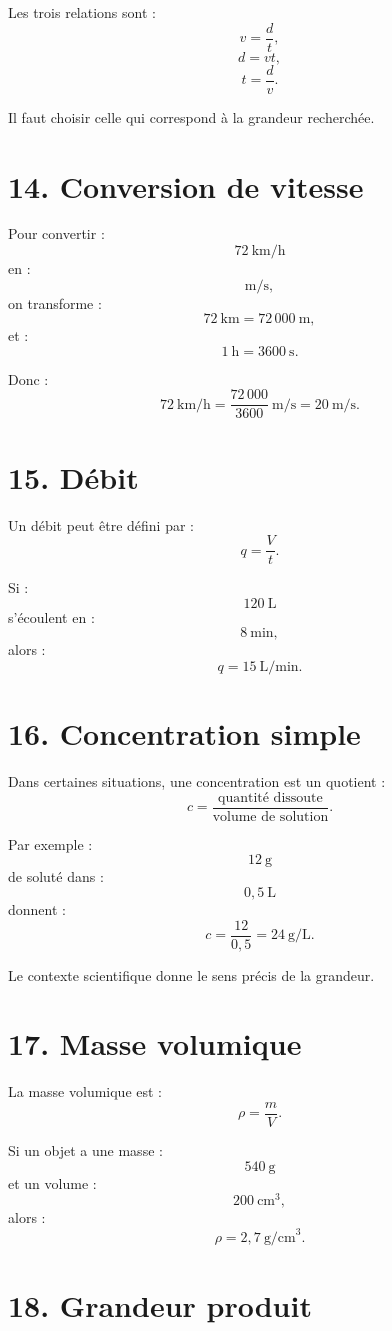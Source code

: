 Les trois relations sont :
\[
\boxed{v=\dfrac dt},
\]
\[
\boxed{d=vt},
\]
\[
\boxed{t=\dfrac dv}.
\]

Il faut choisir celle qui correspond à la grandeur recherchée.

\section{14. Conversion de vitesse}

Pour convertir :
\[
72\ \text{km/h}
\]
en :
\[
\text{m/s},
\]
on transforme :
\[
72\ \text{km}=72\,000\ \text{m},
\]
et :
\[
1\ \text{h}=3600\ \text{s}.
\]

Donc :
\[
72\ \text{km/h}
=
\dfrac{72\,000}{3600}\ \text{m/s}
=
20\ \text{m/s}.
\]

\section{15. Débit}

Un débit peut être défini par :
\[
\boxed{q=\dfrac{V}{t}}.
\]

Si :
\[
120\ \text{L}
\]
s'écoulent en :
\[
8\ \text{min},
\]
alors :
\[
q=15\ \text{L/min}.
\]

\section{16. Concentration simple}

Dans certaines situations, une concentration est un quotient :
\[
c=\dfrac{\text{quantité dissoute}}{\text{volume de solution}}.
\]

Par exemple :
\[
12\ \text{g}
\]
de soluté dans :
\[
0{,}5\ \text{L}
\]
donnent :
\[
c=\dfrac{12}{0{,}5}=24\ \text{g/L}.
\]

Le contexte scientifique donne le sens précis de la grandeur.

\section{17. Masse volumique}

La masse volumique est :
\[
\boxed{\rho=\dfrac mV}.
\]

Si un objet a une masse :
\[
540\ \text{g}
\]
et un volume :
\[
200\ \text{cm}^3,
\]
alors :
\[
\rho=2{,}7\ \text{g/cm}^3.
\]

\section{18. Grandeur produit}

